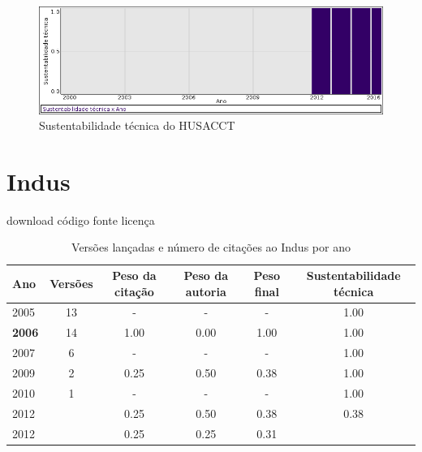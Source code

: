 \begin{figure}[h]
  \center
  \includegraphics[scale=0.50]{imagens/softwares-charts/husacct.png}
  \caption{Sustentabilidade técnica do HUSACCT}
\end{figure}


\section{Indus}
\checkmark download
\checkmark código fonte
\checkmark licença


\begin{table}[H]
\caption{Versões lançadas e número de citações ao Indus por ano}
\centering
\begin{tabular}{| l | c | c | c | c | c |}
  \hline
  Ano & Versões & Peso da citação & Peso da autoria & Peso final & Sustentabilidade técnica \\
  \hline
        2005 & 13 & - & - & -
        &
          {\color{blue} 1.00}
        \\
\hline
            {\bf 2006}
          &
          14
          &
          1.00
          &
          0.00
          &
          1.00
          &
            {\color{blue} 1.00}
          \\
\hline
        2007 & 6 & - & - & -
        &
          {\color{blue} 1.00}
        \\
\hline
            2009
          &
          2
          &
          0.25
          &
          0.50
          &
          0.38
          &
            {\color{blue} 1.00}
          \\
\hline
        2010 & 1 & - & - & -
        &
          {\color{blue} 1.00}
        \\
\hline
            2012
          &
          
          &
          0.25
          &
          0.50
          &
          0.38
          &
            {\color{red} 0.38}
          \\
            2012
          &
          
          &
          0.25
          &
          0.25
          &
          0.31
          &
          \\
\hline
\end{tabular}
\end{table}

